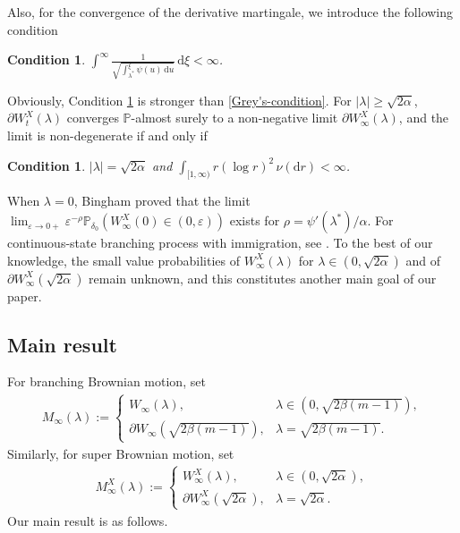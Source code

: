 \documentclass[10pt,a4paper]{amsart}
\newtheorem{con1}[con0]{Condition}
\numberwithin{equation}{section}
\def\bgcondition{\begin{con1}}\def\edcondition{\end{con1}}
\begin{document}
\noindent
Also, for the convergence of the derivative martingale, we introduce the following condition
\bgcondition\label{cond2.5}
$\displaystyle \int^\infty \frac{1}{\sqrt{\int_{\lambda^*}^\xi \psi(u) \, \mathrm{d}u}} \, \mathrm{d}\xi < \infty$.
\edcondition

\noindent
Obviously, Condition \ref{cond2.5} is stronger than \eqref{Grey's-condition}.
For $|\lambda| \geq \sqrt{2\alpha}$, $\partial W_t^X(\lambda)$ converges $\mathbb{P}$-almost surely to a non-negative limit $\partial W_\infty^X(\lambda)$, and the limit is non-degenerate if and only if
\bgcondition\label{cond4}
$|\lambda| = \sqrt{2\alpha}$ and $\displaystyle \int_{[1,\infty)} r (\log r)^2 \, \nu(\mathrm{d}r) < \infty$.
\edcondition

\noindent
When $\lambda = 0$, Bingham \cite{Bingham} proved that the limit $\lim_{\varepsilon \to 0+} \varepsilon^{-\rho} \mathbb{P}_{\delta_0}(W_\infty^X(0) \in (0, \varepsilon))$ exists for $\rho = \psi'(\lambda^*)/\alpha$. For continuous-state branching process with immigration, see \cite{CLR2012}. 
To the best of our knowledge, the small value probabilities of $W_\infty^X(\lambda)$ for $\lambda \in (0, \sqrt{2\alpha})$ and of $\partial W_\infty^X(\sqrt{2\alpha})$ remain unknown, and this constitutes another main goal of our paper.



\subsection{Main result}

For branching Brownian motion, set
\begin{align*}	
	M_\infty(\lambda) := 
	\begin{cases}
		W_\infty(\lambda), & \lambda \in (0, \sqrt{2\beta(m-1)}), \\[4pt]
		\partial W_\infty(\sqrt{2\beta(m-1)}), & \lambda = \sqrt{2\beta(m-1)}.
	\end{cases}
\end{align*}
Similarly, for super Brownian motion, set
\begin{align*}	
	M_\infty^X(\lambda) := 
	\begin{cases}
		W_\infty^X(\lambda), & \lambda \in (0, \sqrt{2\alpha}), \\[4pt]
		\partial W_\infty^X(\sqrt{2\alpha}), & \lambda = \sqrt{2\alpha}.
	\end{cases}
\end{align*}
Our main result is as follows. 
\end{document}
